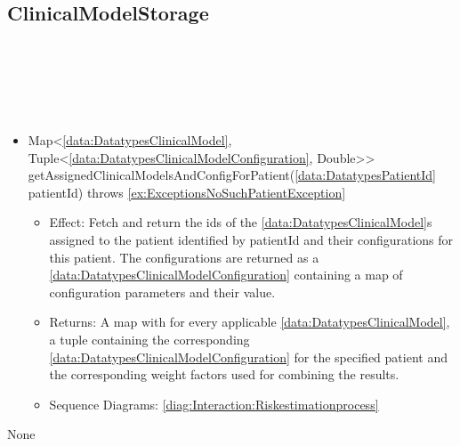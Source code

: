   \subsection{ClinicalModelStorage}\label{int:InterfacesClinicalModelStorage}
    \begin{description}
      \item[Provided by:] \iconcomponent{}~
      \item[Required by:] \iconcomponent{}~ 
      \item[Operations:] ~
    \begin{itemize}[noitemsep,nolistsep,leftmargin=-.25cm]
      \item \textsf{Map\textless{}\ref{data:DatatypesClinicalModel}, Tuple\textless{}\ref{data:DatatypesClinicalModelConfiguration}, Double\textgreater{}\textgreater{} getAssignedClinicalModelsAndConfigForPatient(\ref{data:DatatypesPatientId} patientId) throws \ref{ex:ExceptionsNoSuchPatientException}}
        \begin{itemize}[noitemsep,nolistsep]
           \item Effect: Fetch and return the ids of the \ref{data:DatatypesClinicalModel}s assigned to the patient identified by patientId and their configurations for this patient. The configurations are returned as a \ref{data:DatatypesClinicalModelConfiguration} containing a map of configuration parameters and their value. 
           \item Returns: A map with for every applicable \ref{data:DatatypesClinicalModel}, a tuple containing the corresponding \ref{data:DatatypesClinicalModelConfiguration} for the specified patient and the corresponding weight factors used for combining the results.
           \item Sequence Diagrams: \cref{diag:Interaction:Riskestimationprocess}
        \end{itemize}
    \end{itemize}
      \item[Diagrams:] None
    \end{description}

